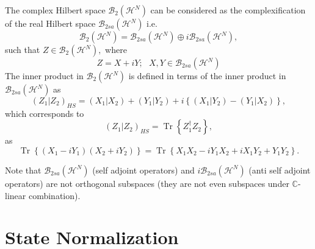 \documentclass[aps,preprint]{revtex4}%
\begin{document}
The complex Hilbert space $\mathcal{B}_{2}\left(  \mathcal{H}^{N}\right)  $
can be considered as the complexification of the real Hilbert space
$\mathcal{B}_{2sa}\left(  \mathcal{H}^{N}\right)  $ i.e.
\begin{equation}
\mathcal{B}_{2}\left(  \mathcal{H}^{N}\right)  =\mathcal{B}_{2sa}\left(
\mathcal{H}^{N}\right)  \oplus i\mathcal{B}_{2sa}\left(  \mathcal{H}%
^{N}\right)  ,
\end{equation}
such that $Z\in\mathcal{B}_{2}\left(  \mathcal{H}^{N}\right)  ,$ where
\begin{equation}
Z=X+iY;\text{ }X,Y\in\mathcal{B}_{2sa}\left(  \mathcal{H}^{N}\right)
\end{equation}
The inner product in $\mathcal{B}_{2}\left(  \mathcal{H}^{N}\right)  $ is
defined in terms of the inner product in $\mathcal{B}_{2sa}\left(
\mathcal{H}^{N}\right)  $ as
\begin{equation}
\left(  Z_{1}\left\vert Z_{2}\right.  \right)  _{HS}=\left(  X_{1}\left\vert
X_{2}\right.  \right)  +\left(  Y_{1}\left\vert Y_{2}\right.  \right)
+i\left\{  \left(  X_{1}\left\vert Y_{2}\right.  \right)  -\left(
Y_{1}\left\vert X_{2}\right.  \right)  \right\}  ,
\end{equation}
which corresponds to
\begin{equation}
\left(  Z_{1}\left\vert Z_{2}\right.  \right)  _{HS}=\operatorname{Tr}\left\{
Z_{1}^{\dagger}Z_{2}\right\}  ,
\end{equation}
as%
\begin{equation}
\operatorname{Tr}\left\{  \left(  X_{1}-iY_{1}\right)  \left(  X_{2}%
+iY_{2}\right)  \right\}  =\operatorname{Tr}\left\{  X_{1}X_{2}-iY_{1}%
X_{2}+iX_{1}Y_{2}+Y_{1}Y_{2}\right\}  .
\end{equation}


Note that $\mathcal{B}_{2sa}\left(  \mathcal{H}^{N}\right)  $ (self adjoint
operators) and $i\mathcal{B}_{2sa}\left(  \mathcal{H}^{N}\right)  $ (anti self
adjoint operators) are not orthogonal subspaces (they are not even subspaces
under $\mathbb{C}$-linear combination).

\section{State Normalization \label{Normalization}}
\end{document}
